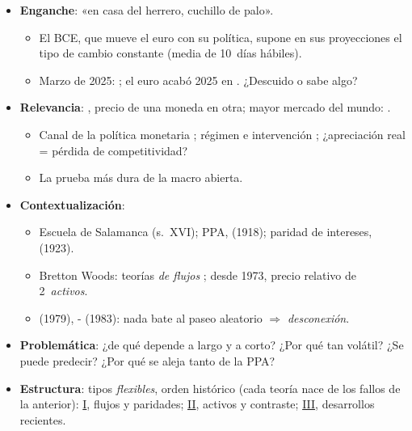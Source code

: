 \documentclass{article}
\begin{document}
\cabecerarepaso
\begin{columnas}

\begin{itemize}
\item \textbf{Enganche}: «en casa del herrero, cuchillo de palo».
  \begin{itemize}
  \item El BCE, que mueve el euro con su política, supone en sus proyecciones el tipo de cambio constante (media de 10~días hábiles).
  \item Marzo de 2025: ; el euro acabó 2025 en . ¿Descuido o sabe algo?
  \end{itemize}
\item \textbf{Relevancia}: , precio de una moneda en otra; mayor mercado del mundo:  .
  \begin{itemize}
  \item Canal de la política monetaria ; régimen e intervención ; ¿apreciación real = pérdida de competitividad?
  \item La prueba más dura de la macro abierta.
  \end{itemize}
\item \textbf{Contextualización}:
  \begin{itemize}
  \item Escuela de Salamanca (s.\ XVI); PPA,  (1918); paridad de intereses,  (1923).
  \item Bretton Woods: teorías \emph{de flujos} ; desde 1973, precio relativo de 2~\emph{activos}.
  \item {} (1979), - (1983): nada bate al paseo aleatorio $\Rightarrow$ \emph{desconexión}.
  \end{itemize}
\item \textbf{Problemática}: ¿de qué depende a largo y a corto? ¿Por qué tan volátil? ¿Se puede predecir? ¿Por qué se aleja tanto de la PPA?
\item \textbf{Estructura}: tipos \emph{flexibles}, orden histórico (cada teoría nace de los fallos de la anterior): \hyperref[rep:I]{I}, flujos y paridades; \hyperref[rep:II]{II}, activos y contraste; \hyperref[rep:III]{III}, desarrollos recientes.
\end{itemize}

\end{columnas}
\end{document}
